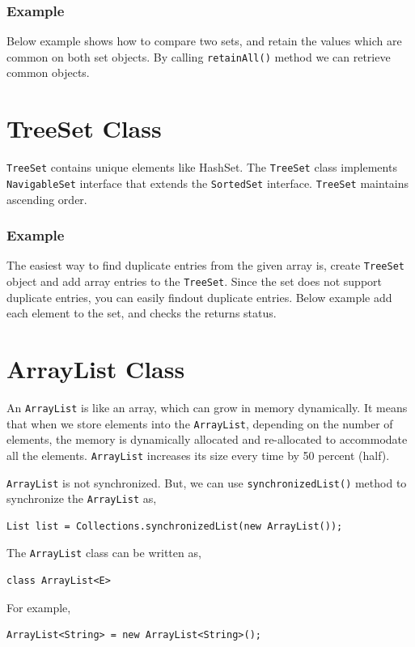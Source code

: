\documentclass[11pt,a4paper]{article}
\begin{document}
\subsubsection*{Example}
Below example shows how to compare two sets, and retain the values which are common on both set objects. By calling \texttt{retainAll()} method we can retrieve common objects.


\section*{TreeSet Class}
\texttt{TreeSet} contains unique elements like HashSet. The \texttt{TreeSet} class implements \texttt{NavigableSet} interface that extends the \texttt{SortedSet} interface. \texttt{TreeSet} maintains ascending order.
\subsubsection*{Example}
The easiest way to find duplicate entries from the given array is, create \texttt{TreeSet} object and add array entries to the \texttt{TreeSet}. Since the set does not support duplicate entries, you can easily findout duplicate entries. Below example add each element to the set, and checks the returns status.


\section*{ArrayList Class}
An \texttt{ArrayList} is like an array, which can grow in memory dynamically. It means that when we store elements into the \texttt{ArrayList}, depending on the number of elements, the memory is dynamically allocated and re-allocated to accommodate all the elements. \texttt{ArrayList} increases its size every time by 50 percent (half). 

\texttt{ArrayList} is not synchronized. But, we can use \texttt{synchronizedList()} method to synchronize the \texttt{ArrayList} as,
\begin{lstlisting}[numbers=none]
List list = Collections.synchronizedList(new ArrayList());
\end{lstlisting}
The \texttt{ArrayList}  class can be written as,
\begin{lstlisting}[numbers=none]
    class ArrayList<E>
\end{lstlisting}
For example,
\begin{lstlisting}[numbers=none]
    ArrayList<String> = new ArrayList<String>();
\end{lstlisting}
\end{document}

